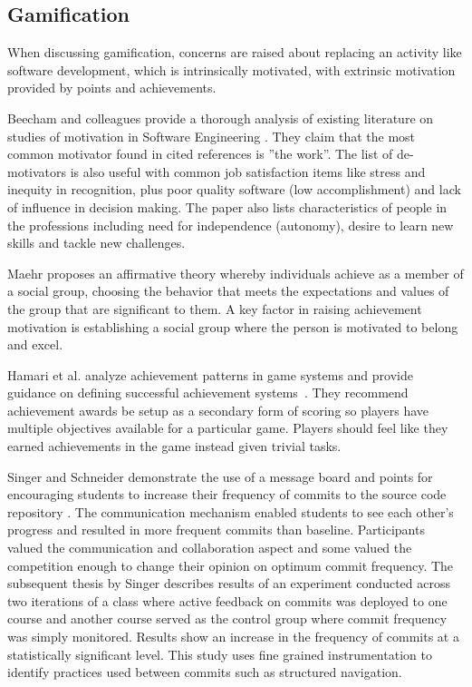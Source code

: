 \documentclass{sig-alternate}
\begin{document}
\subsection{Gamification}

When discussing gamification, concerns are raised about replacing an activity like software development, which is intrinsically motivated, with extrinsic motivation provided by points and achievements.  

Beecham and colleagues provide a thorough analysis of existing literature on studies of motivation in Software Engineering \cite{Beecham2008Motivation}.  They claim that the most common motivator found in cited references is ''the work''. The list of de-motivators is also useful with common job satisfaction items like stress and inequity in recognition, plus poor quality software (low accomplishment) and lack of influence in decision making. The paper also lists characteristics of people in the professions including need for independence (autonomy), desire to learn new skills and tackle new challenges. 

Maehr proposes an affirmative theory whereby individuals achieve as a member of a social group, choosing the behavior that meets the expectations and values of the group that are significant to them\cite{wbsnipes:MaehrCulture}.  A key factor in raising achievement motivation is establishing a social group where the person is motivated to belong and excel.  %

Hamari et al. analyze achievement patterns in game systems and provide guidance on defining successful achievement systems~\cite{wbsnipes:Hamari2011Framework}.  They recommend achievement awards be setup as a secondary form of scoring so players have multiple objectives available for a particular game.  Players should feel like they earned achievements in the game instead given trivial tasks.

Singer and Schneider demonstrate the use of a message board and points for encouraging students to increase their frequency of commits to the source code repository \cite{Singer2012It}.  The communication mechanism enabled students to see each other's progress and resulted in more frequent commits than baseline.  Participants valued the communication and collaboration aspect and some valued the competition enough to change their opinion on optimum commit frequency.  The subsequent thesis by Singer \cite{Singer2013a} describes results of an experiment conducted across two iterations of a class where active feedback on commits was deployed to one course and another course served as the control group where commit frequency was simply monitored.  Results show an increase in the frequency of commits at a statistically significant level.  This study uses fine grained instrumentation to identify practices used between commits such as structured navigation.
\end{document}
